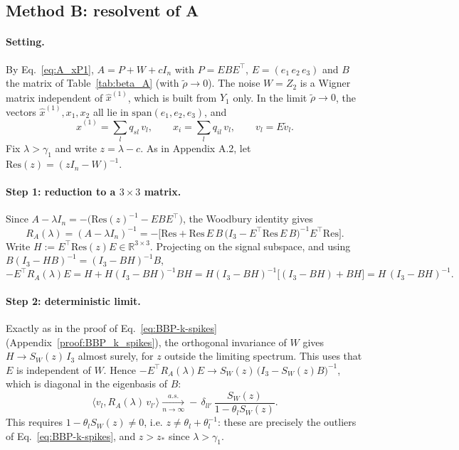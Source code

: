 \subsection{Method B: resolvent of A}
\label{app:B_resolvent}

\paragraph{Setting.} By Eq.~\eqref{eq:A_xP1}, $A = P + W + cI_n$ with $P = EBE^\top$, $E = (e_1\, e_2\, e_3)$ and $B$ the matrix of Table~\ref{tab:beta_A} (with $\tilde\rho \to 0$).
The noise $W = Z_2$ is a Wigner matrix independent of $\hat x^{(1)}$, which is built from $Y_1$ only.
In the limit $\tilde\rho \to 0$, the vectors $\hat x^{(1)}, x_1, x_2$ all lie in $\mathrm{span}(e_1,e_2,e_3)$, and
\begin{equation}
    \hat x^{(1)} = \sum_{l} q_{sl}\, v_l, \qquad x_i = \sum_l q_{il}\, v_l, \qquad v_l = E\tilde v_l .
\end{equation}
Fix $\lambda > \gamma_1$ and write $z = \lambda - c$. As in Appendix A.2, let $\mathrm{Res}(z) = (zI_n - W)^{-1}$.

\paragraph{Step 1: reduction to a $3\times 3$ matrix.}
Since $A - \lambda I_n = -\big(\mathrm{Res}(z)^{-1} - EBE^\top\big)$, the Woodbury identity gives
\begin{equation}
    R_A(\lambda) = (A-\lambda I_n)^{-1}
    = -\Big[\mathrm{Res} + \mathrm{Res}\,E\,B\,\big(I_3 - E^\top \mathrm{Res}\,E\,B\big)^{-1} E^\top \mathrm{Res}\Big] .
\end{equation}
Write $H := E^\top \mathrm{Res}(z) E \in \mathbb{R}^{3\times 3}$. Projecting on the signal subspace, and using
$B(I_3 - HB)^{-1} = (I_3 - BH)^{-1}B$,
\begin{equation}
    -E^\top R_A(\lambda) E = H + H(I_3 - BH)^{-1} B H
    = H (I_3 - BH)^{-1}\big[(I_3 - BH) + BH\big]
    = H\,(I_3 - BH)^{-1} .
\end{equation}

\paragraph{Step 2: deterministic limit.}
Exactly as in the proof of Eq.~\eqref{eq:BBP-k-spikes} (Appendix~\ref{proof:BBP_k_spikes}), the orthogonal invariance of $W$ gives
$H \to S_W(z)\, I_3$ almost surely, for $z$ outside the limiting spectrum. This uses that $E$ is independent of $W$.
Hence $-E^\top R_A(\lambda) E \to S_W(z)\,\big(I_3 - S_W(z) B\big)^{-1}$, which is diagonal in the eigenbasis of $B$:
\begin{equation}
    \langle v_l, R_A(\lambda)\, v_{l'}\rangle
    \xrightarrow[n\to\infty]{a.s.}
    -\,\delta_{ll'}\, \frac{S_W(z)}{1-\theta_l S_W(z)} .
    \label{eq:B_resolvent}
\end{equation}
This requires $1 - \theta_l S_W(z) \neq 0$, i.e. $z \neq \theta_l + \theta_l^{-1}$: these are precisely the outliers of Eq.~\eqref{eq:BBP-k-spikes},
and $z > z_*$ since $\lambda > \gamma_1$.

